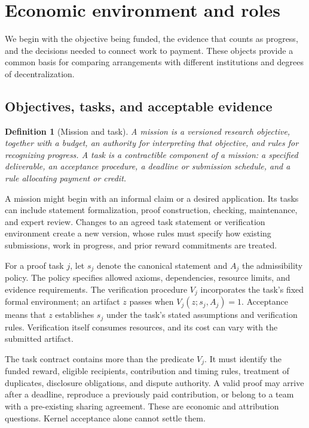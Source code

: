 \documentclass[11pt,a4paper]{article}
\newtheorem{definition}{Definition}
\begin{document}
\section{Economic environment and roles}
\label{sec:roles}
We begin with the objective being funded, the evidence that counts as progress, and the decisions needed to connect work to payment. These objects provide a common basis for comparing arrangements with different institutions and degrees of decentralization.

\subsection{Objectives, tasks, and acceptable evidence}
\begin{definition}[Mission and task]
A \emph{mission} is a versioned research objective, together with a budget, an authority for interpreting that objective, and rules for recognizing progress. A \emph{task} is a contractible component of a mission: a specified deliverable, an acceptance procedure, a deadline or submission schedule, and a rule allocating payment or credit.
\end{definition}
A mission might begin with an informal claim or a desired application. Its tasks can include statement formalization, proof construction, checking, maintenance, and expert review. Changes to an agreed task statement or verification environment create a new version, whose rules must specify how existing submissions, work in progress, and prior reward commitments are treated.

For a proof task $j$, let $s_j$ denote the canonical statement and $A_j$ the admissibility policy. The policy specifies allowed axioms, dependencies, resource limits, and evidence requirements. The verification procedure $V_j$ incorporates the task's fixed formal environment; an artifact $z$ passes when $V_j(z;s_j,A_j)=1$. Acceptance means that $z$ establishes $s_j$ under the task's stated assumptions and verification rules. Verification itself consumes resources, and its cost can vary with the submitted artifact.

The task contract contains more than the predicate $V_j$. It must identify the funded reward, eligible recipients, contribution and timing rules, treatment of duplicates, disclosure obligations, and dispute authority. A valid proof may arrive after a deadline, reproduce a previously paid contribution, or belong to a team with a pre-existing sharing agreement. These are economic and attribution questions. Kernel acceptance alone cannot settle them.
\end{document}
